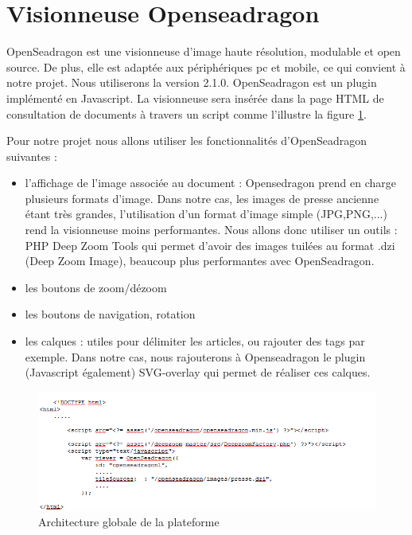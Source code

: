\newpage
\section{Visionneuse Openseadragon}
\label{sec:seadragon}
OpenSeadragon est une visionneuse d’image haute résolution, modulable et open source. De plus, elle est adaptée aux périphériques pc et mobile, ce qui convient à notre projet. Nous utiliserons la version 2.1.0. OpenSeadragon est un plugin implémenté en Javascript. La visionneuse sera insérée dans la page HTML de consultation de documents à travers un script comme l'illustre la figure \ref{seadragon}. 

Pour notre projet nous allons utiliser les fonctionnalités d'OpenSeadragon suivantes : 
\begin{itemize}
	\item l'affichage de l'image associée au document : Opensedragon prend en charge plusieurs formats d'image. Dans notre cas, les images de presse ancienne étant très grandes, l'utilisation d'un format d'image simple (JPG,PNG,...) rend la visionneuse moins performantes. Nous allons donc utiliser un outils : PHP Deep Zoom Tools qui permet d'avoir des images tuilées au format .dzi (Deep Zoom Image), beaucoup plus performantes avec OpenSeadragon.
	\item les boutons de zoom/dézoom 
	\item les boutons de navigation, rotation
	\item les calques : utiles pour délimiter les articles, ou rajouter des tags par exemple. Dans notre cas, nous rajouterons à Openseadragon le plugin (Javascript également) SVG-overlay qui permet de réaliser ces calques.
	\end{itemize}
	
	  \begin{figure}[H]
        \centering
        \includegraphics[width=\textwidth]{figure/osd.png}
            \caption{Architecture globale de la plateforme}
            \label{seadragon}
    \end{figure}
	
	





